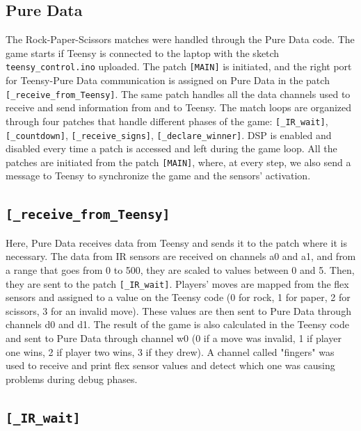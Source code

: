 \documentclass[11pt,a4paper]{report}
\begin{document}
\subsection*{Pure Data}

The Rock-Paper-Scissors matches were handled through the Pure Data code. The game starts if Teensy is connected to the laptop with the sketch \texttt{teensy\_control.ino} uploaded. The patch \texttt{[MAIN]} is initiated, and the right port for Teensy-Pure Data communication is assigned on Pure Data in the patch \texttt{[\_receive\_from\_Teensy]}. The same patch handles all the data channels used to receive and send information from and to Teensy. The match loops are organized through four patches that handle different phases of the game: \texttt{[\_IR\_wait]}, \texttt{[\_countdown]}, \texttt{[\_receive\_signs]}, \texttt{[\_declare\_winner]}. DSP is enabled and disabled every time a patch is accessed and left during the game loop. All the patches are initiated from the patch \texttt{[MAIN]}, where, at every step, we also send a message to Teensy to synchronize the game and the sensors' activation.

\subsection*{\texttt{[\_receive\_from\_Teensy]}}

Here, Pure Data receives data from Teensy and sends it to the patch where it is necessary. The data from IR sensors are received on channels a0 and a1, and from a range that goes from 0 to 500, they are scaled to values between 0 and 5. Then, they are sent to the patch \texttt{[\_IR\_wait]}. Players' moves are mapped from the flex sensors and assigned to a value on the Teensy code (0 for rock, 1 for paper, 2 for scissors, 3 for an invalid move). These values are then sent to Pure Data through channels d0 and d1. The result of the game is also calculated in the Teensy code and sent to Pure Data through channel w0 (0 if a move was invalid, 1 if player one wins, 2 if player two wins, 3 if they drew). A channel called "fingers" was used to receive and print flex sensor values and detect which one was causing problems during debug phases.
\subsection*{\texttt{[\_IR\_wait]}}
\end{document}
